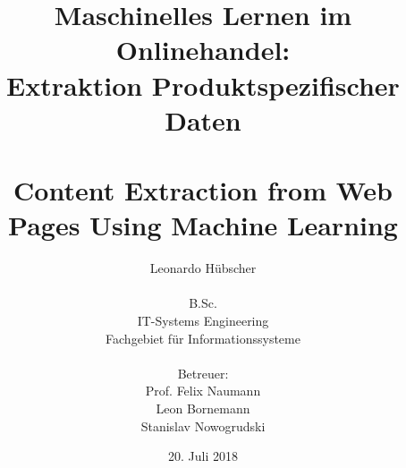 \titlehead{
\hfill \texttt{[image: resources/up\_logo.eps]}
\hfill \texttt{[image: resources/hpi\_logo.eps]}
}
\subject{Bachelorarbeit}
\title{
Maschinelles Lernen im Onlinehandel: \\
Extraktion Produktspezifischer Daten \\
\bigskip \\
\large{Content Extraction from Web Pages Using Machine Learning}
\medskip \\
}
\author{
Leonardo Hübscher\\
\\B.Sc.\\
IT-Systems Engineering\\
Fachgebiet für Informationssysteme \\
\bigskip \\
Betreuer:\\
Prof. Felix Naumann\\
Leon Bornemann\\
Stanislav Nowogrudski
}
\date{20. Juli 2018}